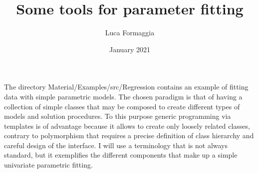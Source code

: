\documentclass{article}
\author{Luca Formaggia}
\title{Some tools for parameter fitting}
\date{January 2021}
\newcommand{\onlyprogramname}[1]{Material/Examples/src/#1}
\begin{document}
\maketitle

The directory \onlyprogramname{Regression} contains an example of
fitting data with simple parametric models.  The chosen paradigm is that of having a
collection of simple classes that may be composed to create
different types of models and solution procedures.  To this purpose
generic programming via templates is of advantage because it allows
to create only loosely related classes, contrary to polymorphism that
requires a precise definition of class hierarchy and careful design of
the interface.  I will use a terminology that is not always
standard, but it exemplifies the different components that make up a
simple univariate parametric fitting.
\end{document}
